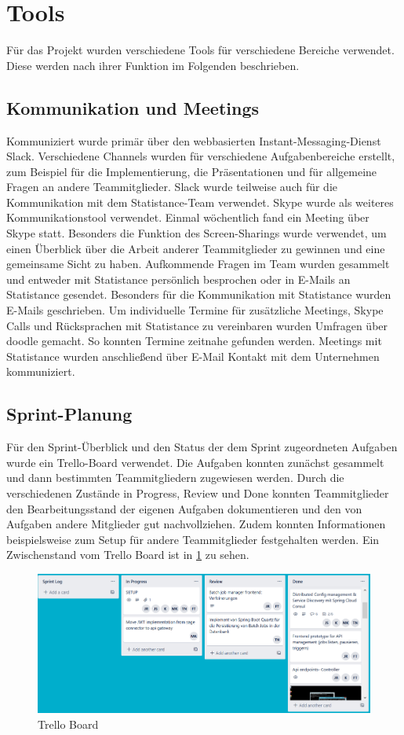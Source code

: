 \section{Tools} 
Für das Projekt wurden verschiedene Tools für verschiedene Bereiche verwendet. Diese werden nach ihrer Funktion im Folgenden beschrieben.
\subsection*{\textbf{Kommunikation und Meetings}} \label{subsubsec:kommunikation} 
Kommuniziert wurde primär über den webbasierten Instant-Messaging-Dienst Slack. Verschiedene Channels wurden für verschiedene Aufgabenbereiche erstellt, zum Beispiel für die Implementierung, die Präsentationen und für allgemeine Fragen an andere Teammitglieder. Slack wurde teilweise auch für die Kommunikation mit dem Statistance-Team verwendet. Skype wurde als weiteres Kommunikationstool verwendet. Einmal wöchentlich fand ein Meeting über Skype statt. Besonders die Funktion des Screen-Sharings wurde verwendet, um einen Überblick über die Arbeit anderer Teammitglieder zu gewinnen und eine gemeinsame Sicht zu haben. Aufkommende Fragen im Team wurden gesammelt und entweder mit Statistance persönlich besprochen oder in E-Mails an Statistance gesendet. Besonders für die Kommunikation mit Statistance wurden E-Mails geschrieben. Um individuelle Termine für zusätzliche Meetings, Skype Calls und Rücksprachen mit Statistance zu vereinbaren wurden Umfragen über doodle gemacht. So konnten Termine zeitnahe gefunden werden. Meetings mit Statistance wurden anschließend über E-Mail Kontakt mit dem Unternehmen kommuniziert.

\subsection*{\textbf{Sprint-Planung}}
Für den Sprint-Überblick und den Status der dem Sprint zugeordneten Aufgaben wurde ein Trello-Board verwendet. Die Aufgaben konnten zunächst gesammelt und dann bestimmten Teammitgliedern zugewiesen werden. Durch die verschiedenen Zustände in Progress, Review und Done konnten Teammitglieder den Bearbeitungsstand der eigenen Aufgaben dokumentieren und den von Aufgaben andere Mitglieder gut nachvollziehen. Zudem konnten Informationen beispielsweise zum Setup für andere Teammitglieder festgehalten werden. Ein Zwischenstand vom Trello Board ist in \ref{fig:trello} zu sehen.

\begin{figure}[!h]
\centering
\includegraphics[width=15cm]{images/0x_organization/TrelloBoard.PNG}
\caption{Trello Board}
\label{fig:trello}
\end{figure}

